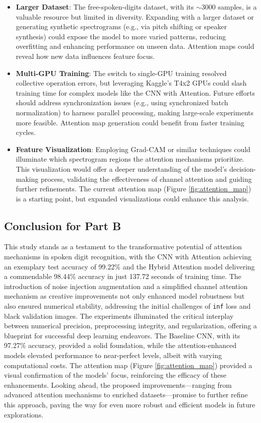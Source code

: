 \documentclass[12pt]{article}
\begin{document}
\begin{itemize}
    \item \textbf{Larger Dataset}: The free-spoken-digits dataset, with its $\sim$3000 samples, is a valuable resource but limited in diversity. Expanding with a larger dataset or generating synthetic spectrograms (e.g., via pitch shifting or speaker synthesis) could expose the model to more varied patterns, reducing overfitting and enhancing performance on unseen data. Attention maps could reveal how new data influences feature focus.
    \item \textbf{Multi-GPU Training}: The switch to single-GPU training resolved collective operation errors, but leveraging Kaggle's T4x2 GPUs could slash training time for complex models like the CNN with Attention. Future efforts should address synchronization issues (e.g., using synchronized batch normalization) to harness parallel processing, making large-scale experiments more feasible. Attention map generation could benefit from faster training cycles.
    \item \textbf{Feature Visualization}: Employing Grad-CAM or similar techniques could illuminate which spectrogram regions the attention mechanisms prioritize. This visualization would offer a deeper understanding of the model's decision-making process, validating the effectiveness of channel attention and guiding further refinements. The current attention map (Figure \ref{fig:attention_map}) is a starting point, but expanded visualizations could enhance this analysis.
\end{itemize}

\subsection{Conclusion for Part B}
This study stands as a testament to the transformative potential of attention mechanisms in spoken digit recognition, with the CNN with Attention achieving an exemplary test accuracy of 99.22\% and the Hybrid Attention model delivering a commendable 98.44\% accuracy in just 137.72 seconds of training time. The introduction of noise injection augmentation and a simplified channel attention mechanism as creative improvements not only enhanced model robustness but also ensured numerical stability, addressing the initial challenges of \texttt{inf} loss and black validation images. The experiments illuminated the critical interplay between numerical precision, preprocessing integrity, and regularization, offering a blueprint for successful deep learning endeavors. The Baseline CNN, with its 97.27\% accuracy, provided a solid foundation, while the attention-enhanced models elevated performance to near-perfect levels, albeit with varying computational costs. The attention map (Figure \ref{fig:attention_map}) provided a visual confirmation of the models' focus, reinforcing the efficacy of these enhancements. Looking ahead, the proposed improvements—ranging from advanced attention mechanisms to enriched datasets—promise to further refine this approach, paving the way for even more robust and efficient models in future explorations.
\end{document}
